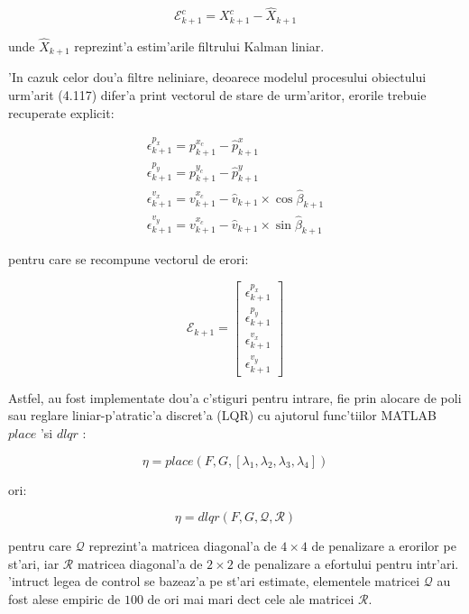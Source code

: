 \documentclass[12pt,a4paper,twoside]{report}
\begin{document}
\begin{equation}
    \mathcal{E}^c_{k+1} = X^c_{k+1} - \hat X_{k+1}
\end{equation}

unde $\hat X_{k+1}$ reprezint'a estim'arile filtrului Kalman liniar. 

\vspace{5px}

'In cazuk celor dou'a filtre neliniare, deoarece modelul procesului obiectului urm'arit (4.117) difer'a print vectorul de stare de urm'aritor, erorile trebuie recuperate explicit: 

\begin{gather}
    \epsilon^{p_x}_{k+1} = p^{x_c}_{k+1} - \hat p^x_{k+1} \\
    \epsilon^{p_y}_{k+1} = p^{y_c}_{k+1} - \hat p^y_{k+1} \\
    \epsilon^{v_x}_{k+1} = v^{x_c}_{k+1} - \hat v_{k+1} \times \cos{ \hat \beta_{k+1}} \\
    \epsilon^{v_y}_{k+1} = v^{x_c}_{k+1} - \hat v_{k+1} \times \sin{ \hat \beta_{k+1}}
\end{gather}

pentru care se recompune vectorul de erori:

\begin{equation}
    \mathcal{E}_{k+1} =  \begin{bmatrix}
      \epsilon^{p_x}_{k+1} \\  \epsilon^{p_y}_{k+1} \\ \epsilon^{v_x}_{k+1} \\  \epsilon^{v_y}_{k+1}
    \end{bmatrix}
\end{equation}

Astfel, au fost implementate dou'a c\ia 'stiguri pentru intrare, fie prin alocare de poli sau reglare liniar-p'atratic'a discret'a (LQR) cu ajutorul func'tiilor MATLAB $place$ \cite{place} 'si $dlqr$ \cite{dlqr}:

\begin{equation}
    \eta = place(F, G, [\lambda_1,\lambda_2,\lambda_3,\lambda_4])
\end{equation}

ori: 

\begin{equation}
    \eta = dlqr(F, G,\mathcal{Q}, \mathcal{R})
\end{equation}

pentru care $\mathcal{Q}$ reprezint'a matricea diagonal'a de $ 4\times 4$ de penalizare a erorilor pe st'ari, iar $\mathcal{R}$ matricea diagonal'a de $ 2\times 2$ de penalizare a efortului pentru intr'ari. 'intruc\ia t legea de control se bazeaz'a pe st'ari estimate, elementele matricei $\mathcal{Q}$ au fost alese empiric de $100$ de ori mai mari dec\ia t cele ale matricei  $\mathcal{R}$.
\end{document}
